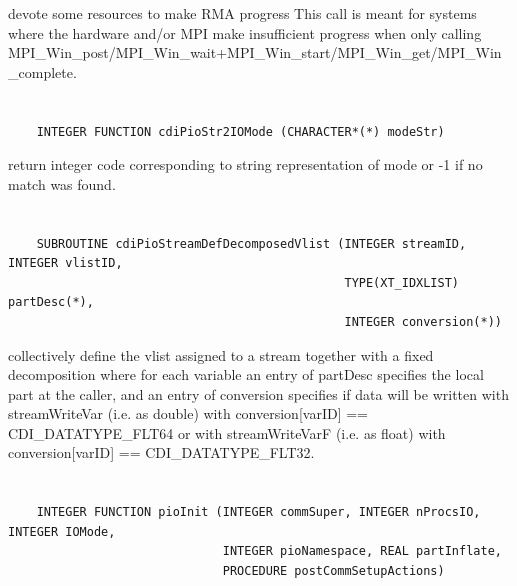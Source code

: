 devote some resources to make RMA progress This
call is meant for systems where the hardware and/or MPI make
insufficient progress when only calling
MPI_Win_post/MPI_Win_wait+MPI_Win_start/MPI_Win_get/MPI_Win_complete.


\section*{\tt {}}

\begin{verbatim}
    INTEGER FUNCTION cdiPioStr2IOMode (CHARACTER*(*) modeStr)
\end{verbatim}

return integer code corresponding to string
representation of mode or -1 if no match was found.


\section*{\tt {}}

\begin{verbatim}
    SUBROUTINE cdiPioStreamDefDecomposedVlist (INTEGER streamID, INTEGER vlistID,
                                               TYPE(XT_IDXLIST) partDesc(*),
                                               INTEGER conversion(*))
\end{verbatim}

collectively define the vlist assigned to a
stream together with a fixed decomposition where for each variable
an entry of partDesc specifies the local part at the caller, and
an entry of conversion specifies if data will be written with
streamWriteVar (i.e. as double) with
conversion[varID] == CDI_DATATYPE_FLT64 or with streamWriteVarF
(i.e. as float) with conversion[varID] == CDI_DATATYPE_FLT32.


\section*{\tt {}}

\begin{verbatim}
    INTEGER FUNCTION pioInit (INTEGER commSuper, INTEGER nProcsIO, INTEGER IOMode,
                              INTEGER pioNamespace, REAL partInflate,
                              PROCEDURE postCommSetupActions)
\end{verbatim}

